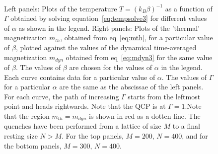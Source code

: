 \documentclass[a4paper,10pt]{article}
\begin{document}
\begin{figure}[h!bt]
\ 
\caption{Left panels: Plots of the temperature $T=(k_B\beta)^{-1}$ as a function of $\Gamma$ obtained by solving equation~\ref{eq:tempsolve3} for different values of $\alpha$ as shown in the legend. Right panels: Plots of the 'thermal' magnetization $m_{th}$, obtained from eq~\ref{eq:mth}, for a particular value of $\beta$, plotted against the values of the dynamical time-averaged magnetization $m_{dyn}$ obtained from eq~\ref{eq:mdyn3} for the same value of $\beta$. The values of $\beta$ are chosen for the values of $\alpha$ in the legend. Each curve contains data for a particular value of $\alpha$. The values of $\Gamma$ for a particular $\alpha$ are the same as the abscissae of the left panels. For each curve, the path of increasing $\Gamma$ starts from the leftmost point and heads rightwards. Note that the QCP is at $\Gamma=1$.Note that the region $m_{th}=m_{dyn}$ is shown in red as a dotten line. The quenches have been performed from a lattice of size $M$ to a final resting size $N>M$. For the top panels,
 $M=200$, $N=400$, and for the bottom panels, $M=300$, $N=400$.}
\label{fig:latsizequench}
\end{figure}
\end{document}
